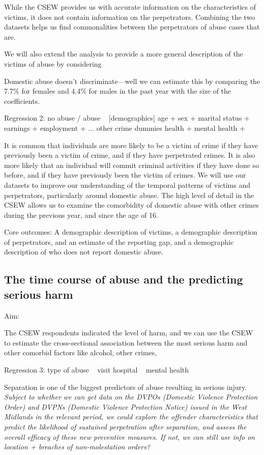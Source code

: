 \documentclass[11pt, a4paper]{article}
\begin{document}
While the CSEW provides us with accurate information on the characteristics of victims, it does not contain information on the perpetrators. Combining the two datasets helps us find commonalities between the perpetrators of abuse cases that are.

We will also extend the analysis to provide a more general description of the victims of abuse by considering 

Domestic abuse doesn't discriminate---well we can estimate this by comparing the 7.7\% for females and 4.4\% for males in the past year with the size of the coefficients.

Regression 2: 
	no abuse / abuse ~ 	[demographics] age + sex + marital status + earnings + employment + ... other crime dummies
		health + mental health +

It is common that individuals are more likely to be a victim of crime if they have previously been a victim of crime, and if they have perpetrated crimes. It is also more likely that an individual will commit criminal activities if they have done so before, and if they have previously been the victim of crimes. We will use our datasets to improve our understanding of the temporal patterns of victims and perpetrators, particularly around domestic abuse. The high level of detail in the CSEW allows us to examine the comorbidity of domestic abuse with other crimes during the previous year, and since the age of 16. 

Core outcomes: A demographic description of victims, a demographic description of perpetrators, and an estimate of the reporting gap, and a demographic description of who does not report domestic abuse.

\subsection{The time course of abuse and the predicting serious harm}

Aim:

The CSEW respondents indicated the level of harm, and we can use the CSEW to estimate the cross-sectional association between the most serious harm and other comorbid factors like alcohol, other crimes, 

Regression 3: type of abuse ~ 
	visit hospital ~ 
	mental health ~ 

Separation is one of the biggest predictors of abuse resulting in serious injury. \textit{Subject to whether we can get data on the DVPOs (Domestic Violence Protection Order) and DVPNs (Domestic Violence Protection Notice) issued in the West Midlands in the relevant period, we could explore the offender characteristics that predict the likelihood of sustained perpetration after separation, and assess the overall efficacy of these new preventive measures. If not, we can still use info on location + breaches of non-molestation orders?}
\end{document}
